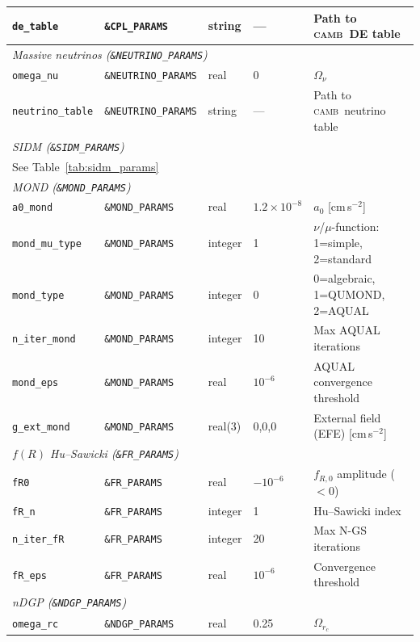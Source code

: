\documentclass[fleqn,usenatbib]{mnras}
\newcommand{\camb}{\textsc{camb}}
\newcommand{\code}[1]{\texttt{#1}}
\newcommand{\Onu}{\Omega_\nu}
\newcommand{\azero}{a_0}
\begin{document}
\begin{table}
\begin{tabular}{lllll}
\code{de\_table}        & \code{\&CPL\_PARAMS}      & string  & --- & Path to \camb\ DE table \\
\midrule
\multicolumn{5}{l}{\emph{Massive neutrinos (\code{\&NEUTRINO\_PARAMS})}} \\
\code{omega\_nu}        & \code{\&NEUTRINO\_PARAMS} & real    & 0   & $\Onu$ \\
\code{neutrino\_table}  & \code{\&NEUTRINO\_PARAMS} & string  & --- & Path to \camb\ neutrino table \\
\midrule
\multicolumn{5}{l}{\emph{SIDM (\code{\&SIDM\_PARAMS})}} \\
\multicolumn{5}{l}{See Table~\ref{tab:sidm_params}} \\
\midrule
\multicolumn{5}{l}{\emph{MOND (\code{\&MOND\_PARAMS})}} \\
\code{a0\_mond}        & \code{\&MOND\_PARAMS}     & real    & $1.2\times10^{-8}$ & $\azero$ [cm\,s$^{-2}$] \\
\code{mond\_mu\_type}  & \code{\&MOND\_PARAMS}     & integer & 1   & $\nu$/$\mu$-function: 1=simple, 2=standard \\
\code{mond\_type}      & \code{\&MOND\_PARAMS}     & integer & 0   & 0=algebraic, 1=QUMOND, 2=AQUAL \\
\code{n\_iter\_mond}   & \code{\&MOND\_PARAMS}     & integer & 10  & Max AQUAL iterations \\
\code{mond\_eps}       & \code{\&MOND\_PARAMS}     & real    & $10^{-6}$ & AQUAL convergence threshold \\
\code{g\_ext\_mond}    & \code{\&MOND\_PARAMS}     & real(3) & 0,0,0 & External field (EFE) [cm\,s$^{-2}$] \\
\midrule
\multicolumn{5}{l}{\emph{$f(R)$ Hu--Sawicki (\code{\&FR\_PARAMS})}} \\
\code{fR0}             & \code{\&FR\_PARAMS}       & real    & $-10^{-6}$ & $f_{R,0}$ amplitude ($<0$) \\
\code{fR\_n}           & \code{\&FR\_PARAMS}       & integer & 1   & Hu--Sawicki index \\
\code{n\_iter\_fR}     & \code{\&FR\_PARAMS}       & integer & 20  & Max N-GS iterations \\
\code{fR\_eps}         & \code{\&FR\_PARAMS}       & real    & $10^{-6}$ & Convergence threshold \\
\midrule
\multicolumn{5}{l}{\emph{nDGP (\code{\&NDGP\_PARAMS})}} \\
\code{omega\_rc}       & \code{\&NDGP\_PARAMS}     & real    & 0.25 & $\Omega_{r_c}$ \\

\end{tabular}
\end{table}
\end{document}

